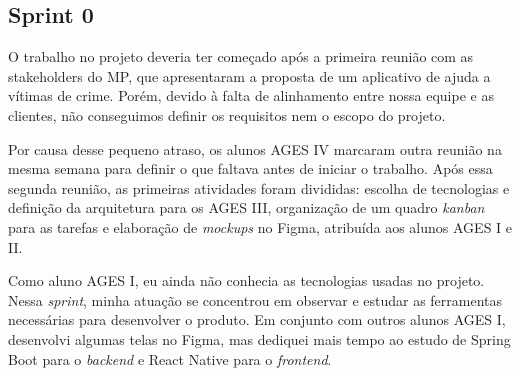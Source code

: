 \subsection{Sprint 0}

O trabalho no projeto deveria ter começado após a primeira reunião com as
stakeholders do MP, que apresentaram a proposta de um aplicativo de ajuda
a vítimas de crime. Porém, devido à falta de alinhamento entre nossa equipe e
as clientes, não conseguimos definir os requisitos nem o escopo do projeto.

Por causa desse pequeno atraso, os alunos AGES IV marcaram outra reunião na
mesma semana para definir o que faltava antes de iniciar o trabalho. Após essa
segunda reunião, as primeiras atividades foram divididas: escolha de
tecnologias e definição da arquitetura para os AGES III, organização de um
quadro \textit{kanban} para as tarefas e elaboração de \textit{mockups} no Figma,
atribuída aos alunos AGES I e II.

Como aluno AGES I, eu ainda não conhecia as tecnologias usadas no projeto.
Nessa \textit{sprint}, minha atuação se concentrou em observar e estudar as
ferramentas necessárias para desenvolver o produto. Em conjunto com outros
alunos AGES I, desenvolvi algumas telas no Figma, mas dediquei mais tempo ao
estudo de Spring Boot para o \textit{backend} e React Native para o
\textit{frontend}.
\medskip

\noindent{}
